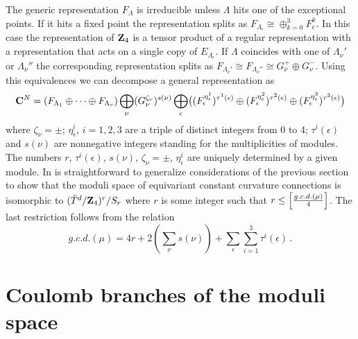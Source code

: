 \documentclass[a4paper,a4paper]{article}
\begin{document}
{The generic representation  $F_{\Lambda}$ is irreducible unless $\Lambda$ hits one of the exceptional points. 
If it hits a fixed point the representation splits as $F_{\Lambda_{\epsilon}} \cong \oplus_{k=0}^{3} F_{\epsilon}^{k}$. 
In this case the representation of ${\bf Z}_{4}$ is a tensor product of a regular representation with a representation 
that acts on a single copy of $E_{\Lambda_{\epsilon}}$. If $\Lambda$ coincides with one of $\Lambda_{\nu}'$ or 
$\Lambda_{\nu}''$ the corresponding representation splits as 
$F_{\Lambda_{\nu}'} \cong F_{\Lambda_{\nu}''} \cong G^{+}_{\nu} \oplus G^{-}_{\nu}$. 
Using this equivalences we can decompose a general representation as 
\begin{equation} \label{z4dec}
{\bf C}^{N} = (F_{\Lambda_{1}}\oplus \dots \oplus F_{\Lambda_{r}}) \bigoplus_{\nu} (G^{\zeta_{\nu}}_{\nu})^{s(\nu)} 
\bigoplus_{\epsilon} \bigl( (F_{\epsilon}^{\eta_{\epsilon}^{1}})^{\tau^{1}(\epsilon)}\oplus 
 (F_{\epsilon}^{\eta_{\epsilon}^{2}})^{\tau^{2}(\epsilon)}\oplus(F_{\epsilon}^{\eta_{\epsilon}^{3}})^{\tau^{3}(\epsilon)} \bigr)
\end{equation}
where $\zeta_{\nu}=\pm$; $\eta_{\epsilon}^{i}$, $i=1,2,3$ are a triple of distinct integers from 0 to 4; 
$\tau^{i}(\epsilon)$ and $s(\nu)$ are nonnegative integers standing for the  multiplicities of modules.  
The numbers $r$, $\tau^{i}(\epsilon)$,  $s(\nu)$, $\zeta_{\nu}=\pm$, $\eta_{\epsilon}^{i}$ are uniquely determined by 
a given module. In is straightforward to generalize considerations of the previous section to show that  the moduli 
space  of equivariant constant curvature connections is isomorphic to $(\tilde T^{d}/{\bf Z}_{4})^{r}/S_{r}$ where 
$r$ is some integer such that $r\le \Bigl[ \frac{g.c.d.(\mu)}{4} \Bigr]$. The last restriction follows from the relation 
$$
g.c.d. (\mu) = 4r + 2(\sum_{\nu} s(\nu) ) + \sum_{\epsilon}\sum_{i=1}^{3} \tau^{i}(\epsilon) \, . 
$$ 


\section{ Coulomb branches of the moduli space}

}
\end{document}
